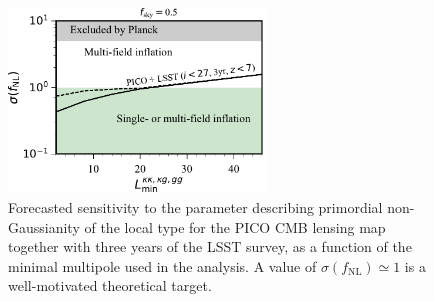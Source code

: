 \documentclass[PICOReport.tex]{subfiles}
\begin{document}
\begin{figure}
\hspace{-0.in}
\parbox{3.1in}{\centerline {
\includegraphics[width=2.7in]{images/PICO_fnl_lmin_PICOv4.1b_deproj0_SENS0.pdf} } }
\hspace{0.in}
\parbox{3.3in}{
\caption{\captiontext 
Forecasted sensitivity to  the parameter describing primordial non-Gaussianity of the local type for the PICO CMB lensing map together with three years of the LSST survey, as a function of the minimal multipole used in the analysis. A value of $\sigma (f_\mathrm{NL}) \simeq 1$ is a well-motivated theoretical target.  
\label{fig:fnlconstraint} 
} }
\vspace{-0.1in}
\end{figure}

\end{document}
